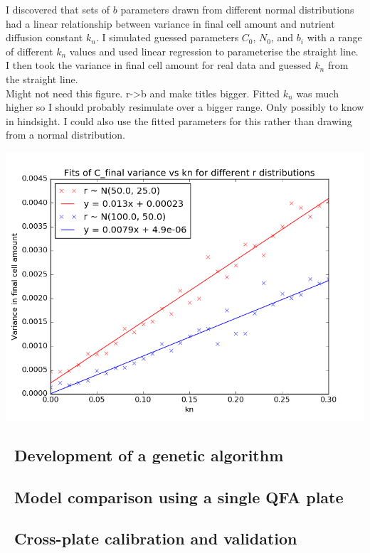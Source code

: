 I discovered that sets of \(b\) parameters drawn from different normal
distributions had a linear relationship between variance in final cell
amount and nutrient diffusion constant \(k_{n}\). I simulated guessed
parameters \(C_0\), \(N_0\), and \(b_{i}\) with a range of different
\(k_{n}\) values and used linear regression to parameterise the
straight line. I then took the variance in final cell amount for real
data and guessed \(k_{n}\) from the straight line.
\\
Might not need this figure. r->b and make titles bigger. Fitted
\(k_{n}\) was much higher so I should probably resimulate over a
bigger range. Only possibly to know in hindsight. I could also use the
fitted parameters for this rather than drawing from a normal
distribution.
\\
\graphicspath{{images/guessing/}}
\begin{Figure}
  \centering
  \includegraphics[width=\linewidth]{final/kn_guessing}
  \label{fig:kn_guessing}
\end{Figure}


\subsection{\thesubsection~Development of a genetic algorithm}
\subsection{\thesubsection~Model comparison using a single QFA plate}
\subsection{\thesubsection~Cross-plate calibration and validation}
